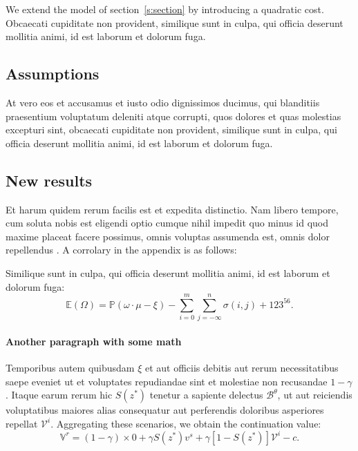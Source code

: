\documentclass[letterpaper,12pt,leqno]{article}
\begin{document}
We extend the model of section~\ref{s:section} by introducing a quadratic cost. Obcaecati cupiditate non provident, similique sunt in culpa, qui officia deserunt mollitia animi, id est laborum et dolorum fuga. 

\subsection{Assumptions} 

At vero eos et accusamus et iusto odio dignissimos ducimus, qui blanditiis praesentium voluptatum deleniti atque corrupti, quos dolores et quas molestias excepturi sint, obcaecati cupiditate non provident, similique sunt in culpa, qui officia deserunt mollitia animi, id est laborum et dolorum fuga. 

\subsection{New results}

 Et harum quidem rerum facilis est et expedita distinctio. Nam libero tempore, cum soluta nobis est eligendi optio cumque nihil impedit quo minus id quod maxime placeat facere possimus, omnis voluptas assumenda est, omnis dolor repellendus \citep{MS22a}. A corrolary in the appendix is as follows:

\begin{corollary} Similique sunt in culpa, qui officia deserunt mollitia animi, id est laborum et dolorum fuga:
\begin{equation*}
\mathbb{E}(\Omega) = \mathbb{P}(\omega\cdot \mu - \xi) - \sum_{i=0}^{m}\sum_{j=-\infty}^{n} \sigma(i,j) + 123^{56}.
\end{equation*}\end{corollary}

\paragraph{Another paragraph with some math} Temporibus autem quibusdam $\xi$ et aut officiis debitis aut rerum necessitatibus saepe eveniet ut et voluptates repudiandae sint et molestiae non recusandae $1-\gamma$. Itaque earum rerum hic $S(z^*)$ tenetur a sapiente delectus $\mathcal{B}^\theta$, ut aut reiciendis voluptatibus maiores alias consequatur aut perferendis doloribus asperiores repellat $\mathcal{V}^i$. Aggregating these scenarios, we obtain the continuation value:
\begin{equation}
\mathbb{V}^r = (1-\gamma) \times 0 +\gamma S(z^*) v^s+\gamma [1-S(z^*)] \mathcal{V}^i-c.
\label{e:appendix1}\end{equation}
\end{document}
